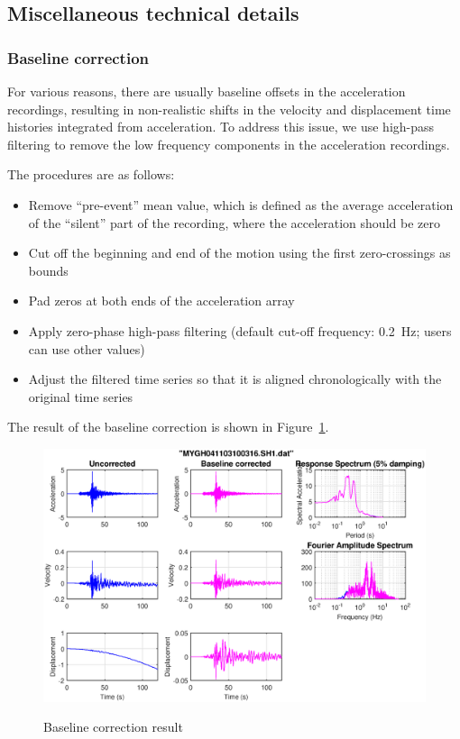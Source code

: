 \documentclass[11pt,letterpaper]{article}
\begin{document}
\newpage
\subsection{Miscellaneous technical details}

\subsubsection{Baseline correction}\label{sec:baseline-correction}

For various reasons, there are usually baseline offsets in the acceleration recordings, resulting in non-realistic shifts in the velocity and displacement time histories integrated from acceleration. To address this issue, we use high-pass filtering to remove the low frequency components in the acceleration recordings.

The procedures are as follows:
\begin{itemize}
	\item Remove ``pre-event'' mean value, which is defined as the average acceleration of the ``silent'' part 
	           of the recording, where the acceleration should be zero
	\item Cut off the beginning and end of the motion using the first zero-crossings as bounds
	\item Pad zeros at both ends of the acceleration array
	\item Apply zero-phase high-pass filtering (default cut-off frequency: 0.2~Hz; users can use other values)
	\item Adjust the filtered time series so that it is aligned chronologically with the original time series
\end{itemize}

The result of the baseline correction is shown in Figure~\ref{fig:baseline_result_duplicate}.%

\begin{figure}[H]
	\centering
	\includegraphics[width=.99\textwidth]{baseline_correction_result_new.eps}\\
	\caption{Baseline correction result}
	\label{fig:baseline_result_duplicate}
\end{figure}
\end{document}

